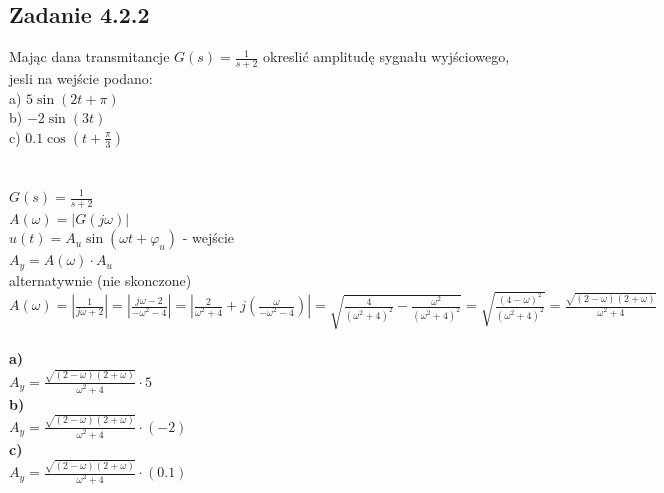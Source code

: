 \pagebreak
\subsection*{Zadanie 4.2.2} {\color{darkgray}
	Mając dana transmitancje $G(s)=\frac{1}{s+2}$ okreslić amplitudę sygnału wyjściowego, jesli na wejście podano:\\
	a) $5\sin(2t+ \pi)$\\
	b) $-2\sin(3t)$\\
	c) $0.1\cos(t+\frac\pi 3)$\\
}\lineh
\\\\
$G(s)=\frac{1}{s+2}$\\
$A(\omega)=|G(j\omega)|$\\
$u(t)=A_u\sin(\omega t+\varphi_u )$ - wejście\\
$A_y=A(\omega) \cdot A_u$\\
alternatywnie (nie skonczone)\\
{\color{lightgray}
$A(\omega)=|\frac1{j\omega+2}|=|\frac{j\omega-2}{-\omega^2-4}|=|\frac2{\omega^2+4}+j(\frac{\omega}{-\omega^2-4})|=\sqrt{\frac{4}{(\omega^2+4)^2}-\frac{\omega^2}{(\omega^2+4)^2}}=\sqrt{\frac{(4-\omega)^2}{(\omega^2+4)^2}}=\frac{\sqrt{(2-\omega)(2+\omega)}}{\omega^2+4}$\\
\\
\textbf{a)}\\
$A_y=\frac{\sqrt{(2-\omega)(2+\omega)}}{\omega^2+4} \cdot 5$\\
\textbf{b)}\\
$A_y=\frac{\sqrt{(2-\omega)(2+\omega)}}{\omega^2+4} \cdot (-2)$\\
\textbf{c)}\\
$A_y=\frac{\sqrt{(2-\omega)(2+\omega)}}{\omega^2+4} \cdot (0.1)$\\
}


